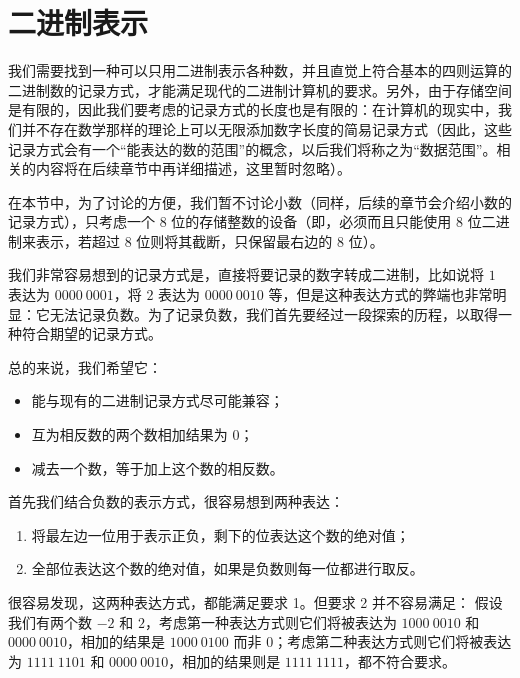 \section{二进制表示}\label{sec:NumberSystemBasics/BinaryPresentation}
    我们需要找到一种可以只用二进制表示各种数，并且直觉上符合基本的四则运算的二进制数的记录方式，才能满足现代的二进制计算机的要求。另外，由于存储空间是有限的，因此我们要考虑的记录方式的长度也是有限的：在计算机的现实中，我们并不存在数学那样的理论上可以无限添加数字长度的简易记录方式（因此，这些记录方式会有一个“能表达的数的范围”的概念，以后我们将称之为“数据范围”。相关的内容将在后续章节中再详细描述，这里暂时忽略）。

    在本节中，为了讨论的方便，我们暂不讨论小数（同样，后续的章节会介绍小数的记录方式），只考虑一个 $8$ 位的存储整数的设备（即，必须而且只能使用 $8$ 位二进制来表示，若超过 $8$ 位则将其截断，只保留最右边的 $8$ 位）。

    我们非常容易想到的记录方式是，直接将要记录的数字转成二进制，比如说将 $1$ 表达为 $0000\ 0001$，将 $2$ 表达为 $0000\ 0010$ 等，但是这种表达方式的弊端也非常明显：它无法记录负数。为了记录负数，我们首先要经过一段探索的历程，以取得一种符合期望的记录方式。

    总的来说，我们希望它：
    \begin{itemize}
        \item 能与现有的二进制记录方式尽可能兼容；
        \item 互为相反数的两个数相加结果为 $0$；
        \item 减去一个数，等于加上这个数的相反数。
    \end{itemize}

    首先我们结合负数的表示方式，很容易想到两种表达：
    \begin{enumerate}
        \item 将最左边一位用于表示正负，剩下的位表达这个数的绝对值；
        \item 全部位表达这个数的绝对值，如果是负数则每一位都进行取反。
    \end{enumerate}

    很容易发现，这两种表达方式，都能满足要求 1。但要求 2 并不容易满足： 假设我们有两个数 $-2$ 和 $2$，考虑第一种表达方式则它们将被表达为 $1000\ 0010$ 和 $0000\ 0010$，相加的结果是 $1000\ 0100$ 而非 $0$；考虑第二种表达方式则它们将被表达为 $1111\ 1101$ 和 $0000\ 0010$，相加的结果则是 $1111\ 1111$，都不符合要求。
